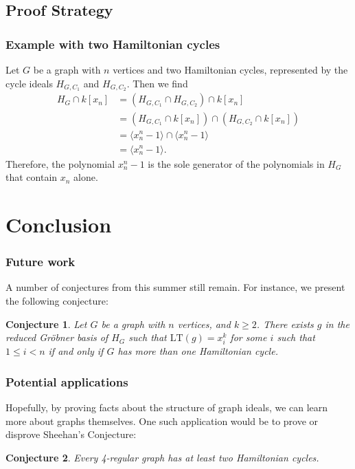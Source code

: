 \documentclass{beamer}
\newtheorem*{conj}{Conjecture}
\begin{document}
\subsection{Proof Strategy}

\begin{frame}
\frametitle{Example with two Hamiltonian cycles}
Let $G$ be a graph with $n$ vertices and two Hamiltonian cycles, represented by the cycle ideals $H_{G,C_1}$ and $H_{G,C_2}$. Then we find
\begin{align*}
	H_G \cap k[x_n] &= (H_{G,C_1} \cap H_{G,C_2}) \cap k[x_n]\\
	&= (H_{G,C_1} \cap k[x_n]) \cap (H_{G,C_2} \cap k[x_n])\\
	&= \langle x_n^n - 1 \rangle \cap \langle x_n^n - 1 \rangle\\
	&= \langle x_n^n - 1 \rangle.
\end{align*}
Therefore, the polynomial $x_n^n - 1$ is the sole generator of the polynomials in $H_G$ that contain $x_n$ alone.
\end{frame}

\section{Conclusion}

\begin{frame}
\frametitle{Future work}
A number of conjectures from this summer still remain. For instance, we present the following conjecture:
\begin{conj}
	Let $G$ be a graph with $n$ vertices, and $k \geq 2$. There exists $g$ in the reduced Gr\"obner basis of $H_G$ such that $\mathrm{LT}(g) = x_i^k$ for some $i$ such that $1 \leq i < n$ if and only if $G$ has more than one Hamiltonian cycle.
\end{conj}
\end{frame}

\begin{frame}
\frametitle{Potential applications}
Hopefully, by proving facts about the structure of graph ideals, we can learn more about graphs themselves. One such application would be to prove or disprove Sheehan's Conjecture:
\begin{conj}
  Every 4-regular graph has at least two Hamiltonian cycles.
\end{conj}
\end{frame}
\end{document}
